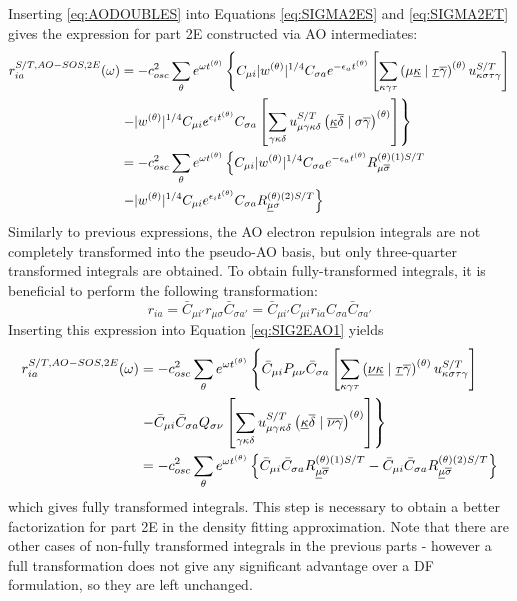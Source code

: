 Inserting \ref{eq:AODOUBLES} into Equations \ref{eq:SIGMA2ES} and \ref{eq:SIGMA2ET} gives the expression for part 2E constructed via AO intermediates:
\begin{equation}
\begin{split}
r_{ia}^{S/T,AO-SOS,2E}(\omega) &= - c_{osc}^2 \sum_{\theta} e^{\omega t^{(\theta)}} \left\lbrace C_{\mu i} |w^{(\theta)}|^{1/4} C_{\sigma a} e^{-\epsilon_a t^{(\theta)}} \left[ \sum_{\kappa\gamma\tau} \left( \mu\underline{\kappa} \mid \underline{\tau}\overline{\gamma} \right)^{(\theta)} u_{\kappa\sigma\tau\gamma}^{S/T} \right] \right. \\
& \left. - |w^{(\theta)}|^{1/4} C_{\mu i} e^{\epsilon_i t^{(\theta)}} C_{\sigma a} \left[\sum_{\gamma\kappa\delta} u_{\mu\gamma\kappa\delta}^{S/T} \left( \underline{\kappa}\overline{\delta} \mid \sigma\overline{\gamma} \right)^{(\theta)} \right] \right\rbrace \\
&= - c_{osc}^2 \sum_{\theta} e^{\omega t^{(\theta)}} \left\lbrace C_{\mu i} |w^{(\theta)}|^{1/4} C_{\sigma a} e^{-\epsilon_a t^{(\theta)}} R^{(\theta)(1)S/T}_{\mu\overline{\sigma}} \right. \\
& \left. - |w^{(\theta)}|^{1/4} C_{\mu i} e^{\epsilon_i t^{(\theta)}} C_{\sigma a} R^{(\theta)(2)S/T}_{\underline{\mu}\sigma} \right\rbrace
\end{split}
\label{eq:SIG2EAO1}
\end{equation}
\noindent Similarly to previous expressions, the AO electron repulsion integrals are not completely transformed into the pseudo-AO basis, but only three-quarter transformed integrals are obtained. To obtain fully-transformed integrals, it is beneficial to perform the following transformation:
\begin{equation}
r_{ia} =  \bar{C}_{\mu i'} r_{\mu \sigma} \bar{C}_{\sigma a'} = \bar{C}_{\mu i'} C_{\mu i} r_{ia} C_{\sigma a} \bar{C}_{\sigma a'}
\end{equation} 
\noindent Inserting this expression into Equation \ref{eq:SIG2EAO1} yields
\begin{equation}
\begin{split}
r_{ia}^{S/T,AO-SOS,2E}(\omega) &= - c_{osc}^2 \sum_{\theta} e^{\omega t^{(\theta)}} \left\lbrace \bar{C}_{\mu i} P_{\mu \nu} \bar{C}_{\sigma a} \left[ \sum_{\kappa\gamma\tau} \left( \underline{\nu}\underline{\kappa} \mid \underline{\tau}\overline{\gamma} \right)^{(\theta)} u_{\kappa\sigma\tau\gamma}^{S/T} \right] \right. \\
& \left. - \bar{C}_{\mu i} \bar{C}_{\sigma a} Q_{\sigma\nu} \left[\sum_{\gamma\kappa\delta} u_{\mu\gamma\kappa\delta}^{S/T} \left( \underline{\kappa}\overline{\delta} \mid \overline{\nu}\overline{\gamma} \right)^{(\theta)} \right] \right\rbrace \\
&= - c_{osc}^2 \sum_{\theta} e^{\omega t^{(\theta)}} \left\lbrace \bar{C}_{\mu i} \bar{C}_{\sigma a} R^{(\theta)(1)S/T}_{\underline{\mu}\overline{\sigma}} - \bar{C}_{\mu i} \bar{C}_{\sigma a} R^{(\theta)(2)S/T}_{\underline{\mu}\overline{\sigma}} \right\rbrace 
\end{split}
\end{equation} 
\noindent which gives fully transformed integrals. This step is necessary to obtain a better factorization for part 2E in the density fitting approximation. Note that there are other cases of non-fully transformed integrals in the previous parts - however a full transformation does not give any significant advantage over a DF formulation, so they are left unchanged.  

